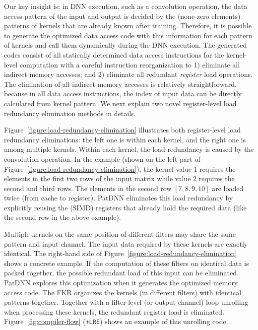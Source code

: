 \documentclass[sigplan,screen]{acmart}
\begin{document}
Our key insight is: in DNN execution, such as a convolution operation, the data access pattern of the input and output is decided by the (none-zero elements) patterns of kernels that are already known after training. Therefore, it is possible to generate the optimized data access code with this information for each pattern of kernels and call them dynamically during the DNN execution. The generated codes consist of all statically determined data access instructions for the kernel-level computation with a careful instruction reorganization to 1) eliminate all indirect memory accesses; and 2) eliminate all redundant {\em register} load operations.
The elimination of all indirect memory accesses is relatively straightforward, because in all data access instructions, the index of input data can be directly calculated from kernel pattern. We next explain two novel register-level load redundancy elimination methods in details.







Figure~\ref{figure:load-redundancy-elimination} illustrates both register-level load redundancy eliminations: the left one is within each kernel, and the right one is among multiple kernels. Within each kernel, the load redundancy is caused by the convolution operation. In the example (shown on the left part of Figure~\ref{figure:load-redundancy-elimination}), the kernel value 1 requires the elements in the first two rows of the input matrix while value 2 requires the second and third rows. The elements in the second row $[7, 8, 9, 10]$ are loaded twice (from cache to register). PatDNN eliminates this load redundancy by explicitly reusing the (SIMD) registers that already hold the required data (like the second row in the above example).

Multiple kernels on the same position of different filters may share the same pattern and input channel.
The input data required by these kernels are exactly identical. The right-hand side of Figure~\ref{figure:load-redundancy-elimination} shows a concrete example. If the computation of these filters on identical data is packed together, the possible redundant load of this input can be eliminated. PatDNN explores this optimization when it generates the optimized memory access code. The FKR organizes the kernels (in different filters) with identical patterns together. Together with a filter-level (or output channel) loop unrolling when processing these kernels, the redundant register load is eliminated. Figure~\ref{fig:compiler-flow} ({\tt +LRE}) shows an example of this unrolling code.
\end{document}
